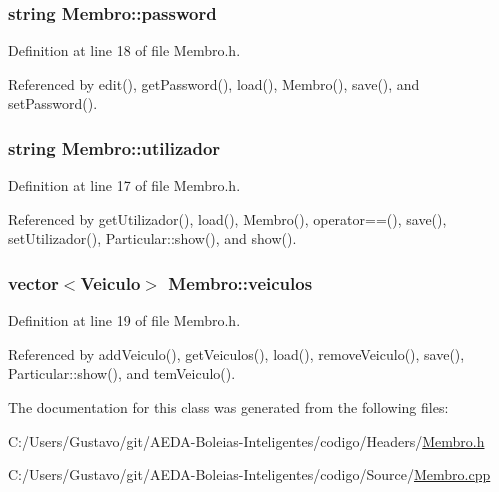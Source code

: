 \hypertarget{class_membro_ae2b12fc3e91efc674c07e735edf4ac21}{
\subsubsection[{password}]{\setlength{\rightskip}{0pt plus 5cm}string Membro\+::password\hspace{0.3cm}{\ttfamily [protected]}}}\label{class_membro_ae2b12fc3e91efc674c07e735edf4ac21}


Definition at line 18 of file Membro.\+h.



Referenced by edit(), get\+Password(), load(), Membro(), save(), and set\+Password().

\hypertarget{class_membro_a42cc733ff94ec8d1bbfdacc62dfbb0e7}{
\subsubsection[{utilizador}]{\setlength{\rightskip}{0pt plus 5cm}string Membro\+::utilizador\hspace{0.3cm}{\ttfamily [protected]}}}\label{class_membro_a42cc733ff94ec8d1bbfdacc62dfbb0e7}


Definition at line 17 of file Membro.\+h.



Referenced by get\+Utilizador(), load(), Membro(), operator==(), save(), set\+Utilizador(), Particular\+::show(), and show().

\hypertarget{class_membro_a7485fc8a9f992a05662866f19b22f74a}{
\subsubsection[{veiculos}]{\setlength{\rightskip}{0pt plus 5cm}vector$<${\bf Veiculo}$>$ Membro\+::veiculos\hspace{0.3cm}{\ttfamily [protected]}}}\label{class_membro_a7485fc8a9f992a05662866f19b22f74a}


Definition at line 19 of file Membro.\+h.



Referenced by add\+Veiculo(), get\+Veiculos(), load(), remove\+Veiculo(), save(), Particular\+::show(), and tem\+Veiculo().



The documentation for this class was generated from the following files\+:\begin{DoxyCompactItemize}
\item 
C\+:/\+Users/\+Gustavo/git/\+A\+E\+D\+A-\/\+Boleias-\/\+Inteligentes/codigo/\+Headers/\hyperlink{_membro_8h}{Membro.\+h}\item 
C\+:/\+Users/\+Gustavo/git/\+A\+E\+D\+A-\/\+Boleias-\/\+Inteligentes/codigo/\+Source/\hyperlink{_membro_8cpp}{Membro.\+cpp}\end{DoxyCompactItemize}
